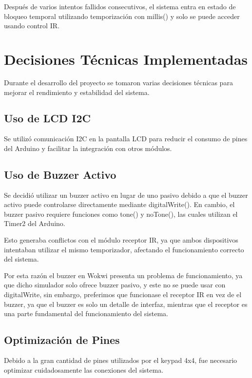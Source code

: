\documentclass[conference]{IEEEtran}
\begin{document}
Después de varios intentos fallidos consecutivos, el sistema entra en estado de bloqueo temporal 
utilizando temporización con millis() y solo se puede acceder usando control IR.

\section{Decisiones Técnicas Implementadas}

Durante el desarrollo del proyecto se tomaron varias decisiones técnicas para mejorar el rendimiento 
y estabilidad del sistema.

\subsection{Uso de LCD I2C}

Se utilizó comunicación I2C en la pantalla LCD para reducir el consumo de pines del Arduino y 
facilitar la integración con otros módulos.

\subsection{Uso de Buzzer Activo}

Se decidió utilizar un buzzer activo en lugar de uno pasivo debido a que el buzzer activo puede 
controlarse directamente mediante digitalWrite(). En cambio, el buzzer pasivo requiere funciones 
como tone() y noTone(), las cuales utilizan el Timer2 del Arduino.

Esto generaba conflictos con el módulo receptor IR, ya que ambos dispositivos intentaban utilizar 
el mismo temporizador, afectando el funcionamiento correcto del sistema.

Por esta razón el buzzer en Wokwi presenta un problema de funcionamiento, ya que dicho simulador
solo ofrece buzzer pasivo, y este no se puede usar con digitalWrite, sin embargo, preferimos que
funcionase el receptor IR en vez de el buzzer, ya que el buzzer es solo un detalle de interfaz,
mientras que el receptor es una parte fundamental del funcionamiento del sistema.

\subsection{Optimización de Pines}

Debido a la gran cantidad de pines utilizados por el keypad 4x4, fue necesario optimizar cuidadosamente 
las conexiones del sistema.
\end{document}
